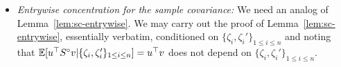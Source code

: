 \documentclass[times,sort&compress,3p]{elsarticle}
\begin{document}
\begin{itemize}
    
    \item {\it Entrywise concentration for the sample covariance:} We need an analog of Lemma~\ref{lem:sc-entrywise}. We may carry out the proof of Lemma~\ref{lem:sc-entrywise}, essentially verbatim, conditioned on $\{\zeta_{i},\zeta_{i}'\}_{1\le i \le n}$ and noting that ${\mathbb{E}}[ u^\top S^{\circ} v | \{\zeta_{i},\zeta_{i}'\}_{1\le i \le n}] = u^\top v$ does not depend on $\{\zeta_{i},\zeta_{i}'\}_{1\le i \le n}$. 
\end{itemize}
% 
     
\end{document}

